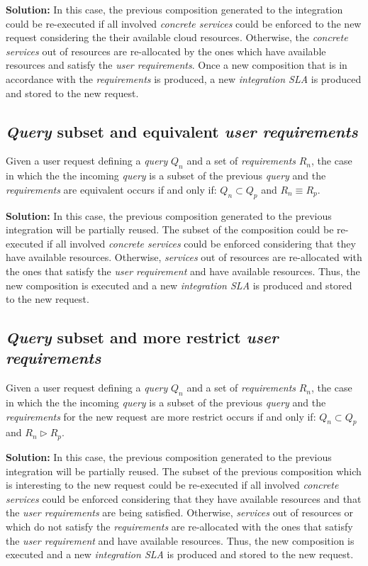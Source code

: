 \bigskip
\noindent \textbf{Solution:} In this case,  the previous composition generated to the integration could be re-executed if all involved \textsl{concrete services} could be enforced to the new request considering the their available cloud resources. Otherwise, the \textsl{concrete services} out of resources are re-allocated by the ones which have available resources and satisfy the \textsl{user requirements}. Once a new composition that is in accordance with the \textsl{requirements} is produced, a new \textsl{integration SLA} is produced and stored to the new request.

\subsection{\textsl{Query} subset and equivalent \textsl{user requirements}}
Given a user request defining a \textsl{query} $Q_{n}$ and a set of \textsl{requirements} $R_{n}$, the case in which the the incoming \textsl{query} is a subset of the previous \textsl{query} and the \textsl{requirements} are equivalent occurs if and only if: $Q_{n} \subset Q_{p}$ and $R_{n} \equiv R_{p}$.

\bigskip
\noindent \textbf{Solution:} In this case, the previous composition generated to the previous integration will be partially reused. The subset of the composition could be re-executed if all involved \textsl{concrete services} could be enforced considering that they have available resources. Otherwise, \textsl{services} out of resources are re-allocated with the ones that satisfy the \textsl{user requirement} and have available resources. Thus, the new composition is executed and a new \textsl{integration SLA} is produced and stored to the new request.

\subsection{\textsl{Query} subset and more restrict \textsl{user requirements}}
Given a user request defining a \textsl{query} $Q_{n}$ and a set of \textsl{requirements} $R_{n}$, the case in which the the incoming \textsl{query} is a subset of the previous \textsl{query} and the \textsl{requirements} for the new request are more restrict occurs if and only if: $Q_{n} \subset Q_{p}$ and $R_{n} \triangleright R_{p}$.

\bigskip
\noindent \textbf{Solution:} In this case, the previous composition generated to the previous integration will be partially reused. The subset of the previous composition which is interesting to the new request could be re-executed if all involved \textsl{concrete services} could be enforced considering that they have available resources and that the \textsl{user requirements} are being satisfied. Otherwise, \textsl{services} out of resources or which do not satisfy the \textsl{requirements} are re-allocated with the ones that satisfy the \textsl{user requirement} and have available resources. Thus, the new composition is executed and a new \textsl{integration SLA} is produced and stored to the new request.

